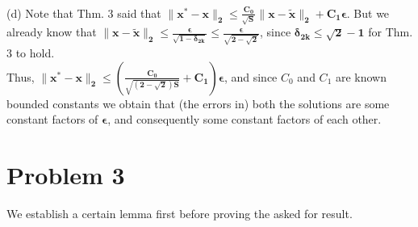 \documentclass[a4paper,11pt]{article}
\numberwithin{definition}{section}
\numberwithin{mytheorem}{subsection}
\begin{document}
\\
(d) Note that Thm. 3 said that $\boldsymbol{\lVert x^* - x\rVert_2\leq\frac{C_0}{\sqrt{S}}\lVert x-\widetilde{x}\rVert_2 + C_1\epsilon}$. But we already know that $\boldsymbol{\lVert x-\widetilde{x}\rVert_2\leq\frac{\epsilon}{\sqrt{1-\delta_{2k}}}\leq\frac{\epsilon}{\sqrt{2-\sqrt{2}}}}$, since $\boldsymbol{\delta_{2k} \leq \sqrt{2} - 1}$ for Thm. 3 to hold.\\
Thus, $\boldsymbol{\lVert x^* - x\rVert_2\leq(\frac{C_0}{\sqrt{(2-\sqrt{2})S}} + C_1)\epsilon}$, and since $C_0$ and $C_1$ are known bounded constants we obtain that (the errors in) both the solutions are some constant factors of $\boldsymbol{\epsilon}$, and consequently some constant factors of each other.






\section{Problem 3}
We establish a certain lemma first before proving the asked for result.
\end{document}
